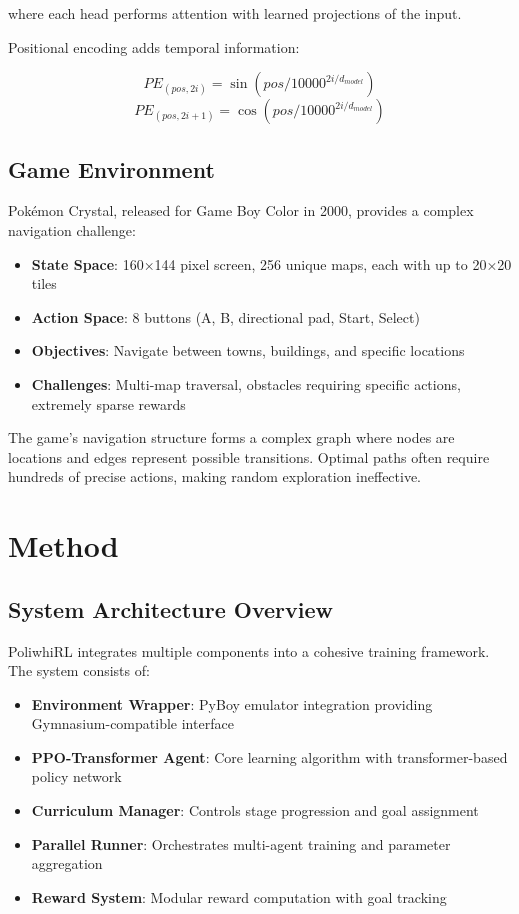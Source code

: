 \documentclass[12pt,a4paper]{article}
\begin{document}
where each head performs attention with learned projections of the input.

Positional encoding adds temporal information:

\begin{equation}
PE_{(pos, 2i)} = \sin(pos/10000^{2i/d_{model}})
\end{equation}
\begin{equation}
PE_{(pos, 2i+1)} = \cos(pos/10000^{2i/d_{model}})
\end{equation}

\subsection{Game Environment}

Pokémon Crystal, released for Game Boy Color in 2000, provides a complex navigation challenge:

\begin{itemize}
    \item \textbf{State Space}: 160×144 pixel screen, 256 unique maps, each with up to 20×20 tiles
    \item \textbf{Action Space}: 8 buttons (A, B, directional pad, Start, Select)
    \item \textbf{Objectives}: Navigate between towns, buildings, and specific locations
    \item \textbf{Challenges}: Multi-map traversal, obstacles requiring specific actions, extremely sparse rewards
\end{itemize}

The game's navigation structure forms a complex graph where nodes are locations and edges represent possible transitions. Optimal paths often require hundreds of precise actions, making random exploration ineffective.

\section{Method}

\subsection{System Architecture Overview}

PoliwhiRL integrates multiple components into a cohesive training framework. The system consists of:

\begin{itemize}
    \item \textbf{Environment Wrapper}: PyBoy emulator integration providing Gymnasium-compatible interface
    \item \textbf{PPO-Transformer Agent}: Core learning algorithm with transformer-based policy network
    \item \textbf{Curriculum Manager}: Controls stage progression and goal assignment
    \item \textbf{Parallel Runner}: Orchestrates multi-agent training and parameter aggregation
    \item \textbf{Reward System}: Modular reward computation with goal tracking
\end{itemize}
\end{document}
